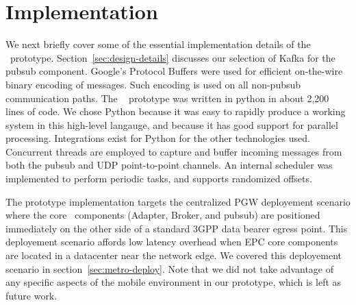 \section{Implementation}

We next briefly cover some of the essential implementation details of
the \name~prototype. Section~\ref{sec:design-details} discusses our
selection of Kafka for the pubsub component. Google's Protocol Buffers
were used for efficient on-the-wire binary encoding of messages. Such
encoding is used on all non-pubsub communication paths. The \name~
prototype was written in python in about 2,200 lines of code. We chose
Python because it was easy to rapidly produce a working system in this
high-level langauge, and because it has good support for parallel
processing. Integrations exist for Python for the other technologies
used. Concurrent threads are employed to capture and buffer incoming
messages from both the pubsub and UDP point-to-point channels. An
internal scheduler was implemented to perform periodic tasks, and
supports randomized offsets.

The prototype implementation targets the centralized PGW deployement
scenario where the core \name~components (Adapter, Broker, and
pubsub) are positioned immediately on the other side of a standard
3GPP data bearer egress point. This deployement scenario affords low
latency overhead when EPC core components are located in a datacenter
near the network edge.  We covered this deployement scenario in
section~\ref{sec:metro-deploy}.  Note that we did not take advantage
of any specific aspects of the mobile environment in our prototype,
which is left as future work.
